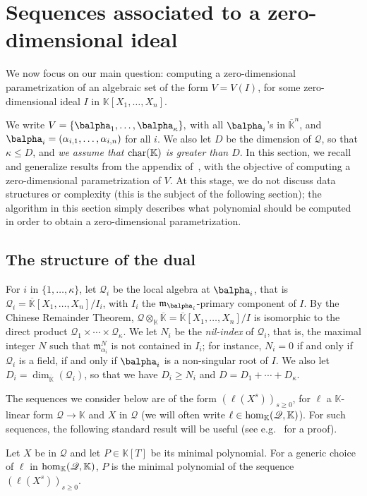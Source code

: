 \documentclass[12pt]{article}
\newcommand{\lf}{X}
\newcommand{\residueI}{\mathscr{Q}}
\def\dg{\kappa}
\def\K{\mathbb{K}}
\def\K {\ensuremath{\mathbb{K}}}
\def\Kbar {{\ensuremath{\overline{\mathbb{K}}}}}
\def\D {\ensuremath{D}}
\def\m {\ensuremath{\mathfrak{m}}}
\begin{document}

\section{Sequences associated to a zero-dimensional ideal}

We now focus on our main question: computing a zero-dimensional
parametrization of an algebraic set of the form $V=V(I)$, for some
zero-dimensional ideal $I$ in $\K[X_1,\dots,X_n]$. 

We write $V=\{\balpha_1,\dots,\balpha_\dg\},$ with all $\balpha_i$'s in
$\Kbar^n$, and $\balpha_i=(\alpha_{i,1},\dots,\alpha_{i,n})$ for all
$i$.  We also let $\D$ be the dimension of $\residueI$, so that $\dg \le \D$,
and {\em we assume that ${\rm char}(\K)$ is greater than $D$}. In this
section, we recall and generalize results from the appendix
of~\cite{BoSaSc03}, with the objective of computing a zero-dimensional
parametrization of $V$. At this stage, we do not discuss data
structures or complexity (this is the subject of the following
section); the algorithm in this section simply describes what 
polynomial should be computed in order to obtain a zero-dimensional
parametrization.


\subsection{The structure of the dual}\label{ssec:dual}

For $i$ in $\{1,\dots,\dg\}$, let $\residueI_i$ be the local algebra at
$\balpha_i$, that is $\residueI_i=\Kbar[X_1,\dots,X_n]/I_i$, with $I_i$ the
$\m_{\balpha_i}$-primary component of $I$. By the Chinese Remainder
Theorem, $\residueI\otimes_\K \Kbar=\Kbar[X_1,\dots,X_n]/I$ is isomorphic to
the direct product $\residueI_1\times \cdots \times \residueI_\dg$.  We let $N_i$ be the
{\em nil-index} of $\residueI_i$, that is, the maximal integer $N$ such that
$\m_{\alpha_i}^N$ is not contained in $I_i$; for instance, $N_i=0$ if
and only if $\residueI_i$ is a field, if and only if $\balpha_i$ is a
non-singular root of $I$. We also let $\D_i=\dim_\Kbar(\residueI_i)$, so that
we have $D_i \ge N_i$ and $\D=\D_1 + \cdots + \D_\dg$.

The sequences we consider below are of the form $(\ell(\lf^s))_{s \ge
  0}$, for $\ell$ a $\K$-linear form $\residueI \to \K$ and $\lf$ in $\residueI$
(we will often write $\ell \in {\rm hom}_\K(\residueI,\K)$). For
such sequences, the following standard result will be useful
(see e.g.~\cite[Proposition~1 \& 2]{BoSaSc03} for a proof).
\begin{lemma}\label{lemma:minpoly}
  Let $\lf$ be in $\residueI$ and let $P \in \K[T]$ be its minimal
  polynomial. For a generic choice of $\ell$ in ${\rm hom}_\K(\residueI,\K)$,
  $P$ is the minimal polynomial of the sequence $(\ell(\lf^s))_{s \ge
    0}$.
\end{lemma}
\end{document}
